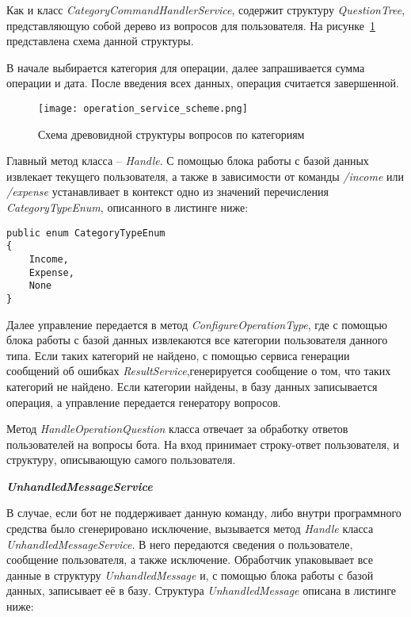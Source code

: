 Как и класс \emph{CategoryCommandHandlerService}, содержит структуру
\linebreak \emph{QuestionTree}, представляющую собой дерево из вопросов для пользователя. На рисунке~\ref{fig:design:server:operation_service_scheme} представлена схема данной структуры.

В начале выбирается категория для операции, далее запрашивается
сумма операции и дата. После введения всех данных, операция считается завершенной.

\begin{figure}[!h]
\centering
	\texttt{[image: operation\_service\_scheme.png]}
	\caption{Схема древовидной структуры вопросов по категориям}
	\label{fig:design:server:operation_service_scheme}
\end{figure}

Главный метод класса – \emph{Handle}. С помощью блока работы с базой
данных извлекает текущего пользователя, а также в зависимости от команды \emph{/income} или \emph{/expense} устанавливает в контекст одно из значений перечисления \emph{CategoryTypeEnum}, описанного в листинге ниже:

\lstset{style=sharpc}
\begin{lstlisting}
public enum CategoryTypeEnum
{
	Income,
	Expense,
	None
}
\end{lstlisting}

Далее управление передается в метод \emph{ConfigureOperationType}, где с помощью блока работы с базой данных извлекаются все категории
пользователя данного типа. Если таких категорий не найдено, с помощью сервиса генерации сообщений об ошибках \emph{ResultService},генерируется сообщение о том, что таких категорий не найдено. Если категории найдены, в базу данных записывается операция, а управление передается генератору вопросов.

Метод \emph{HandleOperationQuestion} класса отвечает за обработку ответов пользователей на вопросы бота. На вход принимает строку-ответ пользователя, и структуру, описывающую самого пользователя.

\textbf{\emph{UnhandledMessageService}}

В случае, если бот не поддерживает данную команду, либо внутри программного средства было сгенерировано исключение, вызывается метод \emph{Handle} класса \emph{UnhandledMessageService}. В него передаются сведения о пользователе, сообщение пользователя, а также исключение. Обработчик упаковывает все данные в структуру \emph{UnhandledMessage} и, с помощью блока работы с базой данных, записывает её в базу. Структура \emph{UnhandledMessage} описана в листинге ниже:

